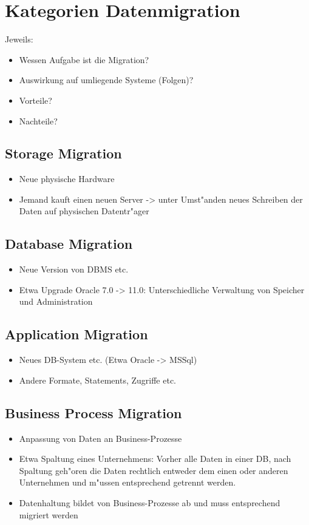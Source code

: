 \section{Kategorien Datenmigration}

Jeweils:
\begin{itemize}
	\item Wessen Aufgabe ist die Migration?
	\item Auswirkung auf umliegende Systeme (Folgen)?
	\item Vorteile?
	\item Nachteile?
\end{itemize}

\subsection{Storage Migration}

\begin{itemize}
	\item Neue physische Hardware
	\item Jemand kauft einen neuen Server -> unter Umst"anden neues Schreiben der Daten auf physischen Datentr"ager
\end{itemize}

\subsection{Database Migration}

\begin{itemize}
	\item Neue Version von DBMS etc.
	\item Etwa Upgrade Oracle 7.0 -> 11.0: Unterschiedliche Verwaltung von Speicher und Administration
\end{itemize}

\subsection{Application Migration}

\begin{itemize}
	\item Neues DB-System etc. (Etwa Oracle -> MSSql)
	\item Andere Formate, Statements, Zugriffe etc.
\end{itemize}

\subsection{Business Process Migration}

\begin{itemize}
	\item Anpassung von Daten an Business-Prozesse
	\item Etwa Spaltung eines Unternehmens: Vorher alle Daten in einer DB, nach Spaltung geh"oren die Daten rechtlich entweder dem einen oder anderen Unternehmen und m"ussen entsprechend getrennt werden.
	\item Datenhaltung bildet von Business-Prozesse ab und muss entsprechend migriert werden
\end{itemize}


